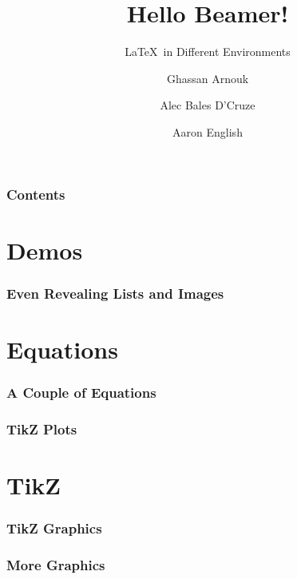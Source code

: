 \documentclass{beamer}
\title{Hello Beamer!}
\subtitle{\LaTeX~in Different Environments}
\author{Ghassan Arnouk \and
            Alec Bales D'Cruze \and
            Aaron English}
\date{\DTMusedate{presentation}}
\begin{document}
    \begin{frame}
        \titlepage
    \end{frame}
    \begin{frame}
        \frametitle{Contents}
        \tableofcontents
    \end{frame}
    \section{Demos}
        \begin{frame}
            \frametitle{Even Revealing Lists and Images}
            \begin{overlayarea}{\textwidth}{\textheight}
            \end{overlayarea}
        \end{frame}
    \section{Equations}
        \begin{frame}
            \frametitle{A Couple of Equations}
        \end{frame}
        \begin{frame}
            \frametitle{TikZ Plots}
        \end{frame}
    \section{TikZ}
        \begin{frame}
            \frametitle{TikZ Graphics}
        \end{frame}
        \begin{frame}
            \frametitle{More Graphics}
          \end{frame}
\end{document}
